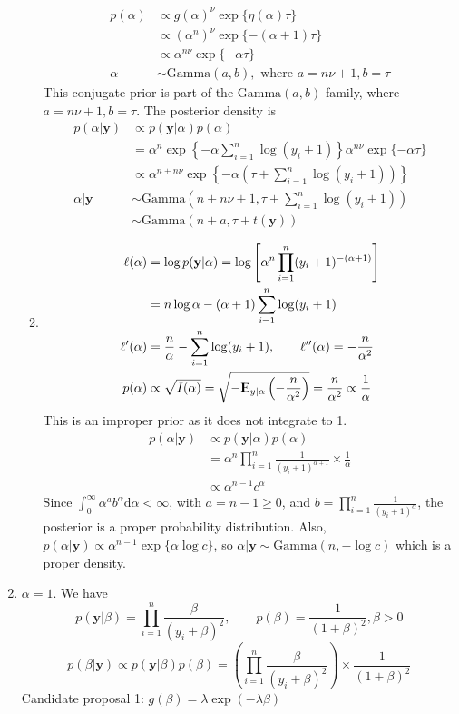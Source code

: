 \documentclass[a4paper,12pt]{article}\usepackage[]{graphicx}\usepackage[]{color}
\newcommand{\Expect}{{\rm I\kern-.3em E}}
\newcommand{\by}{\mathbf{y}}
\newcommand{\Gammad}{\mathrm{Gamma}}
\newcommand{\id}{\mathrm{d}}
\begin{document}
\begin{enumerate}[label=(\alph*)]
\begin{enumerate}[label=(\roman*)]
\begin{align*}
p(\alpha)&\propto g(\alpha)^\nu\exp\{\eta(\alpha)\tau\} \\
&\propto (\alpha^n)^\nu\exp\{-(\alpha+1)\tau\} \\
&\propto \alpha^{n\nu}\exp\{-\alpha\tau\}\\
\alpha&\sim\Gammad(a,b),\textrm{\ where\ }a=n\nu+1,b=\tau 
\end{align*}
This conjugate prior is part of the $\Gammad(a,b)$ family, where $a=n\nu+1,b=\tau$.
The posterior density is
\begin{align*}
p(\alpha|\by)&\propto p(\by|\alpha)p(\alpha)\\
&=\alpha^n\exp\left\{-\alpha\sum_{i=1}^n\log(y_i+1)\right\}\alpha^{n\nu}\exp\{-\alpha\tau\}\\
&\propto \alpha^{n+n\nu}\exp\left\{-\alpha\left(\tau+\sum_{i=1}^n\log(y_i+1)\right)\right\}\\
\alpha|\by&\sim\Gammad\left(n+n\nu+1,\tau+\sum_{i=1}^n\log(y_i+1)\right)\\
&\sim \Gammad(n+a,\tau+t(\by))
\end{align*}
\item 
\begin{align*}
\ell(\alpha)&=\log p(\by|\alpha)=\log\left[\alpha^n\prod_{i=1}^n(y_i+1)^{-(\alpha+1)}\right] \\
&= n\log\alpha-(\alpha+1)\sum_{i=1}^n\log(y_i+1)\\
\ell'(\alpha) &= \frac{n}{\alpha}-\sum_{i=1}^n\log(y_i+1),\qquad \ell''(\alpha)=-\frac{n}{\alpha^2} \\
p(\alpha)&\propto\sqrt{I(\alpha)}=\sqrt{-\Expect_{y|\alpha}\left(-\frac{n}{\alpha^2}\right)}=\frac{n}{\alpha^2}\propto \frac{1}{\alpha}
\end{align*}
This is an improper prior as it does not integrate to 1.
\begin{align*}
p(\alpha|\by) &\propto p(\by|\alpha)p(\alpha) \\
&= \alpha^n\prod_{i=1}^n\frac{1}{(y_i+1)^{\alpha+1}}\times\frac{1}{\alpha} \\
&\propto \alpha^{n-1}c^\alpha
\end{align*}
Since $\int_{0}^{\infty}\alpha^ab^\alpha \id\alpha<\infty$, with $a=n-1\geq 0$, and $b=\prod_{i=1}^n\frac{1}{(y_i+1)^\alpha}$, the posterior is a proper probability distribution. Also, $p(\alpha|\by)\propto\alpha^{n-1}\exp\{\alpha\log c\}$, so $\alpha|\by\sim\Gammad(n,-\log c)$ which is a proper density.
\end{enumerate}
\item $\alpha=1$. We have 
$$p(\by|\beta)=\prod_{i=1}^n\frac{\beta}{(y_i+\beta)^2},\qquad p(\beta)=\frac{1}{(1+\beta)^2},\beta>0$$
$$p(\beta|\by)\propto p(\by|\beta)p(\beta)=\left(\prod_{i=1}^n\frac{\beta}{(y_i+\beta)^2}\right)\times \frac{1}{(1+\beta)^2}$$
Candidate proposal 1: $g(\beta)=\lambda\exp(-\lambda\beta)$


\end{enumerate}
\end{document}
